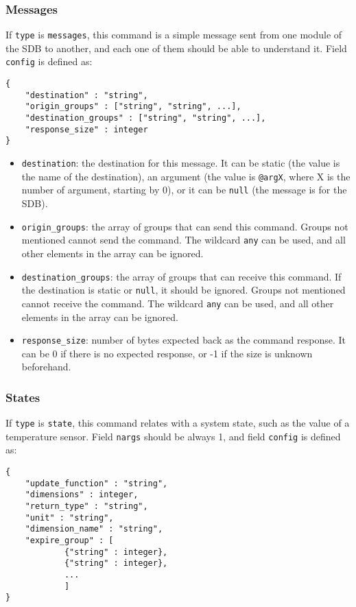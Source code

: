 \documentclass[12pt,a4paper]{report}
\begin{document}
\subsubsection*{Messages}
If \texttt{type} is \texttt{messages}, this command is a simple message sent from one module of the SDB to another, and each one of them should be able to understand it. Field \texttt{config} is defined as:
\begin{lstlisting}
{
	"destination" : "string",
	"origin_groups" : ["string", "string", ...],
	"destination_groups" : ["string", "string", ...],
	"response_size" : integer
}
\end{lstlisting}

\begin{itemize}
\item \texttt{destination}: the destination for this message. It can be static (the value is the name of the destination), an argument (the value is \texttt{@argX}, where X is the number of argument, starting by 0), or it can be \texttt{null} (the message is for the SDB).
\item \texttt{origin\_groups}: the array of groups that can send this command. Groups not mentioned cannot send the command. The wildcard \texttt{any} can be used, and all other elements in the array can be ignored.
\item \texttt{destination\_groups}: the array of groups that can receive this command. If the destination is static or \texttt{null}, it should be ignored. Groups not mentioned cannot receive the command. The wildcard \texttt{any} can be used, and all other elements in the array can be ignored.
\item \texttt{response\_size}: number of bytes expected back as the command response. It can be 0 if there is no expected response, or -1 if the size is unknown beforehand.
\end{itemize}

\subsubsection*{States}
If \texttt{type} is \texttt{state}, this command relates with a system state, such as the value of a temperature sensor. Field \texttt{nargs} should be always 1, and field \texttt{config} is defined as:
\begin{lstlisting}
{
    "update_function" : "string",
    "dimensions" : integer,
    "return_type" : "string",
    "unit" : "string",
    "dimension_name" : "string",
    "expire_group" : [
    		{"string" : integer},
    		{"string" : integer},
    		...
    		]
}
\end{lstlisting}
\end{document}
